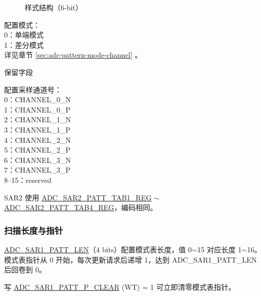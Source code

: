 \documentclass[main\_\_CN.tex]{subfiles}
\begin{document}
\begin{figure}[H]
\centering
{}%
%
%
\end{figure}
\vspace{-2em}
\begin{figure}[H]
    \centering
    \caption{样式结构（6-bit）}
    \label{fig:adc-pattern-table-entry}
\end{figure}
\vspace{-2em}
\begin{regdesc}\begin{reglist}
\item [mode] 配置模式：\\
0：单端模式\\
1：差分模式\\

详见章节 \ref{sec:adc-pattern-mode-channel} \textit{}。

\item [reserved] 保留字段
\item [channel] 配置采样通道号：\\
0：CHANNEL\_0\_N \\
1：CHANNEL\_0\_P \\
2：CHANNEL\_1\_N\\
3：CHANNEL\_1\_P\\
4：CHANNEL\_2\_N\\
5：CHANNEL\_2\_P\\
6：CHANNEL\_3\_N\\
7：CHANNEL\_3\_P\\
8–15：reserved \\


\end{reglist}\end{regdesc}

SAR2 使用 \hyperref[regdesc:ADCSAR2PATTTAB1REG]{ADC\_SAR2\_PATT\_TAB1\_REG} $\sim$ \hyperref[regdesc:ADCSAR2PATTTAB4REG]{ADC\_SAR2\_PATT\_TAB4\_REG}，编码相同。

\subsubsection{扫描长度与指针}
\hyperref[fielddesc:ADCSAR1PATTLEN]{ADC\_SAR1\_PATT\_LEN}（4 bits）配置模式表长度，值 0$\sim$15 对应长度 1$\sim$16。模式表指针从 0 开始，每次更新请求后递增 1，达到 ADC\_SAR1\_PATT\_LEN 后回卷到 0。

写 \hyperref[fielddesc:ADCSAR1PATTPCLEAR]{ADC\_SAR1\_PATT\_P\_CLEAR} (WT) = 1 可立即清零模式表指针。
\end{document}
